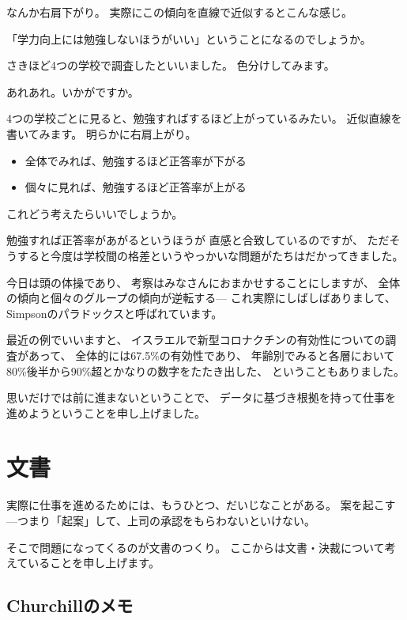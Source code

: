 \documentclass[uplatex,jis2004,dvipdfmx,12pt]{jsarticle}
\begin{document}
なんか右肩下がり。
実際にこの傾向を直線で近似するとこんな感じ。

「学力向上には勉強しないほうがいい」ということになるのでしょうか。

さきほど4つの学校で調査したといいました。
色分けしてみます。

あれあれ。いかがですか。

4つの学校ごとに見ると、勉強すればするほど上がっているみたい。
近似直線を書いてみます。
明らかに右肩上がり。


\begin{itemize}
 \item 全体でみれば、勉強するほど正答率が下がる
 \item 個々に見れば、勉強するほど正答率が上がる
\end{itemize}
これどう考えたらいいでしょうか。

勉強すれば正答率があがるというほうが
直感と合致しているのですが、
ただそうすると今度は学校間の格差というやっかいな問題がたちはだかってきました。

今日は頭の体操であり、
考察はみなさんにおまかせすることにしますが、
全体の傾向と個々のグループの傾向が逆転する---
これ実際にしばしばありまして、
Simpsonのパラドックスと呼ばれています。

最近の例でいいますと、
イスラエルで新型コロナクチンの有効性についての調査があって、
全体的には67.5\%の有効性であり、
年齢別でみると各層において80\%後半から90\%超とかなりの数字をたたき出した、
ということもありました。




思いだけでは前に進まないということで、
データに基づき根拠を持って仕事を進めようということを申し上げました。
\newpage

\section{文書}


実際に仕事を進めるためには、もうひとつ、だいじなことがある。
案を起こす---つまり「起案」して、上司の承認をもらわないといけない。

そこで問題になってくるのが文書のつくり。
ここからは文書・決裁について考えていることを申し上げます。

\subsection{Churchillのメモ}
\end{document}
